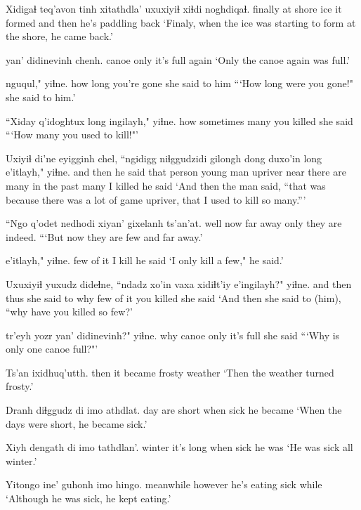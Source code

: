\documentclass[12pt]{article}
\begin{document}
\gll Xidigaɬ teq'avon tinh xitathdla' uxuxiyiɬ xiɬdi noghdiqaɬ.
finally {at shore} ice {it formed} and  then {he's paddling back}
\glt `Finaly, when the ice was starting to form at the shore, he came back.'
\glend 

 yan' didinevinh chenh.
canoe  only {it's full} again
\glt `Only the canoe again was full.'
\glend 

 nguqul," yiɬne.
{how long}  {you're gone} {she said to him}
\glt ```How long were you gone!" she said to him.'
\glend 

\gll ``Xiday q'idoghtux long ingilayh," yiɬne.
how  sometimes many {you killed} {she said}
\glt ```How many you used to kill!"'
\glend 

\gll Uxiyiɬ di'ne eyigginh chel, ``ngidigg niɬggudzidi gilongh dong duxo'in long e'itlayh," yiɬne.
{and then} {he said} {that person} {young man} upriver  near  {there are many} {in the past} many {I killed} {he said}
\glt `And then the man said, ``that was because there was a lot of game upriver, that I used to kill so many.'''
\glend 

\gll ``Ngo  q'odet nedhodi xiyan' gixelanh ts'an'at.
well  now  {far away} only  {they are} indeed.
\glt ```But now they are few and far away.'
\glend 

 e'itlayh," yiɬne.
{few  of it}  {I kill}  {he said}
\glt `I only kill a few," he said.'
\glend 

\gll Uxuxiyiɬ yuxudz dideɬne, {``ndadz xo'in} {vaxa xidiɬt'iy} e'ingilayh?" yiɬne.
{and then} thus {she said to} why   {few of it}   {you killed} {she said}
\glt `And then she said to (him), ``why have you killed so few?'
\glend 

 {tr'eyh yozr} yan' didinevinh?" yiɬne.
why   canoe only {it's full}  {she said}
\glt ```Why is only one canoe full?"'
\glend 

\gll Ts'an ixidhuq'utth.
then {it became frosty weather}
\glt `Then the weather turned frosty.'
\glend 

\gll Dranh diɬggudz di imo athdlat.
day {are short} when sick {he became}
\glt `When the days were short, he became sick.'
\glend 

\gll Xiyh dengath di imo tathdlan'.
winter {it's long} when sick {he was}
\glt `He was sick all winter.'
\glend 

\gll Yitongo ine'  guhonh imo hingo.
meanwhile however {he's eating}  sick while
\glt `Although he was sick, he kept eating.'
\glend 
\end{document}
